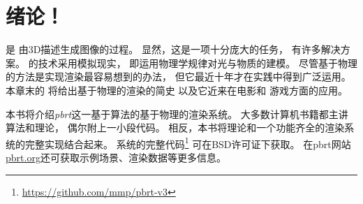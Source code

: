 
\chapter{绪论！}\label{chap:绪论}
\setcounter{sidenote}{1}

是
由3D描述生成图像的过程。
显然，这是一项十分庞大的任务，
有许多解决方案。
的技术采用模拟现实，
即运用物理学规律对光与物质的建模。
尽管基于物理的方法是实现渲染最容易想到的办法，
但它最近十年才在实践中得到广泛运用。
本章末的
将给出基于物理的渲染的简史
以及它近来在电影和
游戏方面的应用。

本书将介绍\emph{pbrt}这一基于算法的基于物理的渲染系统。
大多数计算机书籍都主讲算法和理论，
偶尔附上一小段代码。
相反，本书将理论和一个功能齐全的渲染系统的完整实现结合起来。
系统的完整代码\footnote{\url{https://github.com/mmp/pbrt-v3}}
可在BSD许可证下获取。
在pbrt网站\href{https://pbrt.org}{\ttfamily pbrt.org}还可获取示例场景、渲染数据等更多信息。


















